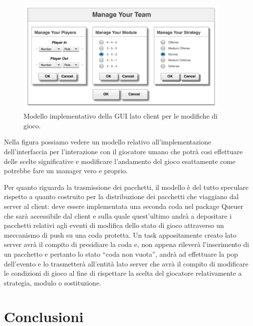 \documentclass[aps,letterpaper,10pt]{article}
\begin{document}
\begin{figure}[H]
	\begin{center}
		\includegraphics[width=400px]{images/gui-example.pdf}
	\end{center}
\caption{Modello implementativo della GUI lato client per le modifiche di gioco.}
\end{figure}

Nella figura possiamo vedere un modello relativo all'implementazione dell'interfaccia per l'interazione con il giocatore umano che potr\`a cosi effettuare delle scelte significative e modificare l'andamento del gioco esattamente come potrebbe fare un manager vero e proprio. \vspace{3mm}

Per quanto riguarda la trasmissione dei pacchetti, il modello \`e del tutto speculare rispetto a quanto costruito per la distribuzione dei pacchetti che viaggiano dal server al client: deve essere implementata una seconda coda nel package Queuer che sar\`a accessibile dal client e sulla quale quest'ultimo andr\`a a depositare i pacchetti relativi agli eventi di modifica dello stato di gioco attraverso un meccanismo di push su una coda protetta. Un task appositamente creato lato server avr\`a il compito di presidiare la coda e, non appena rilever\`a l'inserimento di un pacchetto e pertanto lo stato ``coda non vuota'', andr\`a ad effettuare la pop dell'evento e lo trasmetter\`a all'entit\`a lato server che avr\`a il compito di modificare le condizioni di gioco al fine di rispettare la scelta del giocatore relativamente a strategia, modulo o sostituzione.


\newpage

\section{Conclusioni}
\end{document}
